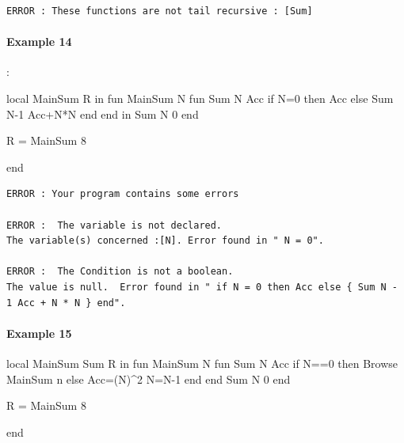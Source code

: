\documentclass[11pt,a4paper,twoside,openright]{report}
\begin{document}
\begin{lstlisting}
ERROR : These functions are not tail recursive : [Sum]
\end{lstlisting}

%
%
%
%
\newpage
\paragraph{Example 14}:

\begin{OZ}
local MainSum R in
	fun {MainSum N}
		fun {Sum N Acc}
			if N=0 then Acc
			else {Sum N-1 Acc+N*N}
			end
		end
		in {Sum N 0}
	end

	R = {MainSum 8}

end
\end{OZ}

\begin{lstlisting}
ERROR : Your program contains some errors

ERROR :  The variable is not declared. 
The variable(s) concerned :[N]. Error found in " N = 0".

ERROR :  The Condition is not a boolean. 
The value is null.  Error found in " if N = 0 then Acc else { Sum N - 1 Acc + N * N } end".
\end{lstlisting}

\paragraph{Example 15}
\begin{OZ}
local MainSum Sum R in
	fun {MainSum N}
		fun {Sum N Acc}
			if N==0 then {Browse {MainSum n}}
			else Acc=(N)^2 N=N-1
			end
	    end
    {Sum N 0}
	end

	R = {MainSum 8}

end

\end{OZ}
\end{document}
